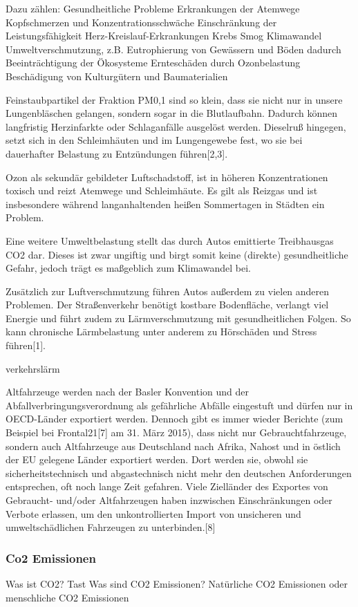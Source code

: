 Dazu zählen:
Gesundheitliche Probleme
Erkrankungen der Atemwege
Kopfschmerzen und Konzentrationsschwäche
Einschränkung der Leistungsfähigkeit
Herz-Kreislauf-Erkrankungen
Krebs
Smog
Klimawandel
Umweltverschmutzung, z.B. Eutrophierung von Gewässern und Böden
dadurch Beeinträchtigung der Ökosysteme
Ernteschäden durch Ozonbelastung
Beschädigung von Kulturgütern und Baumaterialien


Feinstaubpartikel der Fraktion PM0,1 sind so klein, dass sie nicht nur in unsere Lungenbläschen gelangen, sondern sogar in die Blutlaufbahn. Dadurch können langfristig Herzinfarkte oder Schlaganfälle ausgelöst werden. Dieselruß hingegen, setzt sich in den Schleimhäuten und im Lungengewebe fest, wo sie bei dauerhafter Belastung zu Entzündungen führen[2,3].

Ozon als sekundär gebildeter Luftschadstoff, ist in höheren Konzentrationen toxisch und reizt Atemwege und Schleimhäute. Es gilt als Reizgas und ist insbesondere während langanhaltenden heißen Sommertagen in Städten ein Problem.



Eine weitere Umweltbelastung stellt das durch Autos emittierte Treibhausgas CO2 dar. Dieses ist zwar ungiftig und birgt somit keine (direkte) gesundheitliche Gefahr, jedoch trägt es maßgeblich zum Klimawandel bei.

Zusätzlich zur Luftverschmutzung führen Autos außerdem zu vielen anderen Problemen. Der Straßenverkehr benötigt kostbare Bodenfläche, verlangt viel Energie und führt zudem zu Lärmverschmutzung mit gesundheitlichen Folgen. So kann chronische Lärmbelastung unter anderem zu Hörschäden und Stress führen[1].

verkehrslärm


Altfahrzeuge werden nach der Basler Konvention und der Abfallverbringungsverordnung als gefährliche Abfälle eingestuft und dürfen nur in OECD-Länder exportiert werden. Dennoch gibt es immer wieder Berichte (zum Beispiel bei Frontal21[7] am 31. März 2015), dass nicht nur Gebrauchtfahrzeuge, sondern auch Altfahrzeuge aus Deutschland nach Afrika, Nahost und in östlich der EU gelegene Länder exportiert werden. Dort werden sie, obwohl sie sicherheitstechnisch und abgastechnisch nicht mehr den deutschen Anforderungen entsprechen, oft noch lange Zeit gefahren. Viele Zielländer des Exportes von Gebraucht- und/oder Altfahrzeugen haben inzwischen Einschränkungen oder Verbote erlassen, um den unkontrollierten Import von unsicheren und umweltschädlichen Fahrzeugen zu unterbinden.[8]

\subsubsection{Co2 Emissionen}
Was ist \ac{CO2}? Tast
Was sind \ac{CO2} Emissionen?
Natürliche \ac{CO2} Emissionen oder menschliche CO2 Emissionen
